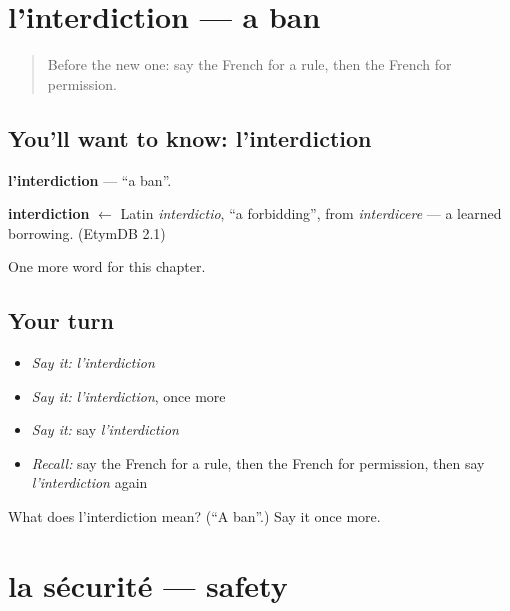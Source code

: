 \section[l'interdiction]{l'interdiction — a ban}

\label{lesson:FR-C168-interdiction}



\begin{quote}
Before the new one: say the French for a rule, then the French for permission.
\end{quote}

\subsection*{You'll want to know: l'interdiction}
\textbf{l'interdiction} — \textquotedblleft{}a ban\textquotedblright{}.

\begin{cousinweb}
\textbf{interdiction} $\leftarrow$ Latin \emph{interdictio}, \textquotedblleft{}a forbidding\textquotedblright{}, from \emph{interdicere} — a learned borrowing. (EtymDB 2.1)
\end{cousinweb}

\begin{grammarlens}[title={What you've built}]
One more word for this chapter.
\end{grammarlens}

\subsection*{Your turn}
\begin{itemize}
\raggedright
  \item \emph{Say it:} \emph{l'interdiction}
  \item \emph{Say it:} \emph{l'interdiction}, once more
  \item \emph{Say it:} say \emph{l'interdiction}
  \item \emph{Recall:} say the French for a rule, then the French for permission, then say \emph{l'interdiction} again
\end{itemize}

\begin{tcolorbox}[breakable,colback=teal!4,colframe=teal!35!black,title={Before you move on}]
What does l'interdiction mean? (\textquotedblleft{}A ban\textquotedblright{}.) Say it once more.
\end{tcolorbox}
\section[la sécurité]{la sécurité — safety}

